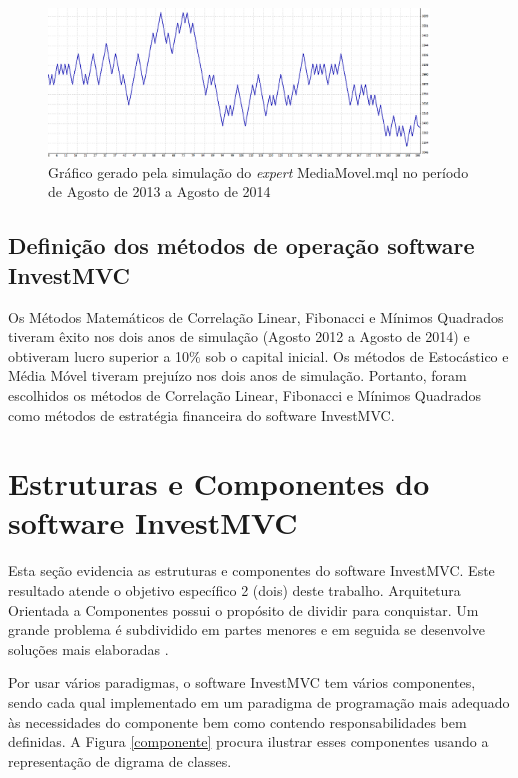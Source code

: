 \begin{figure}[H]
\centering
\includegraphics[width=0.9\textwidth]{figuras/protocoloMedia4}
\caption{ Gráfico gerado pela simulação do \textit{expert} MediaMovel.mql no período de Agosto de 2013 a Agosto de 2014} 
\label{protocoloMedia4}
\end{figure}


\subsection{Definição dos métodos de operação software InvestMVC}

Os Métodos Matemáticos de Correlação Linear, Fibonacci e Mínimos Quadrados tiveram êxito nos dois anos de simulação (Agosto 2012 a Agosto de 2014) e obtiveram lucro superior a 10\%  sob o capital inicial. Os métodos de Estocástico e Média Móvel tiveram prejuízo nos dois anos de simulação. Portanto, foram escolhidos os métodos de Correlação Linear, Fibonacci e Mínimos Quadrados como métodos de estratégia financeira do software InvestMVC.

\section{Estruturas e Componentes do software InvestMVC}
Esta seção evidencia as estruturas e componentes do software InvestMVC. Este resultado atende o objetivo específico 2 (dois) deste trabalho.
Arquitetura Orientada a Componentes possui o propósito de dividir para conquistar. Um grande problema é subdividido em partes menores e em seguida se desenvolve soluções mais elaboradas \cite{john}.

Por usar vários paradigmas, o software InvestMVC tem vários componentes, sendo cada qual implementado em um paradigma de programação mais adequado às necessidades do componente bem como contendo responsabilidades bem definidas. A Figura \ref{componente} procura ilustrar esses componentes usando a representação de digrama de classes.

